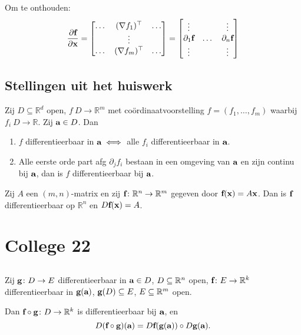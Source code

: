\documentclass{2wa40summary}
\begin{document}
			Om te onthouden:
			\[ \frac{\partial {\textbf{f}}}{\partial {\textbf{x}}} = \begin{bmatrix}
			\dots & (\nabla f_1)^\top & \dots \\
			& \vdots & \\
			\dots & (\nabla f_m)^\top & \dots
			\end{bmatrix} =
			\begin{bmatrix}
			\vdots & & \vdots \\
			\partial_1 {\textbf{f}} & \dots & \partial_n {\textbf{f}} \\
			\vdots & & \vdots
			\end{bmatrix}\]
			
		\subsection{Stellingen uit het huiswerk}
			\theorem Zij $ D \subseteq \mathbb{R}^d $ open, $ f\:  D \to \mathbb{R}^m $ met co\"ordinaatvoorstelling $ f=(f_1,\dots,f_m) $ waarbij $ f_i \:  D \to \mathbb{R} $. Zij $ {\textbf{a}} \in D $. Dan
			\begin{enumerate}[(1)]
				\item $ f $ differentieerbaar in $ {\textbf{a}} \iff $ alle $ f_i $ differentieerbaar in $ {\textbf{a}} $.
				\item Alle eerste orde part afg $ \partial_j f_i $ bestaan in een omgeving van $ {\textbf{a}} $ en zijn continu bij $ {\textbf{a}} $, dan is $ f $ differentieerbaar bij $ {\textbf{a}} $.
			\end{enumerate}
			\theorem Zij $ A $ een $ (m,n) $-matrix en zij $ {\textbf{f}}\colon \mathbb{R}^n \to \mathbb{R}^m $ gegeven door $ {\textbf{f}}({\textbf{x}})=A{\textbf{x}} $. Dan is $ {\textbf{f}} $ differentieerbaar op $ \mathbb{R}^n $ en $ D{\textbf{f}}({\textbf{x}}) = A $.
			
	\newpage
	\section{College 22}
		\subsection{}
			\theorem Zij ${\textbf{g}}\colon D \to E$ differentieerbaar in ${\textbf{a}} \in D$, $D \subseteq \mathbb{R}^n$ open, ${\textbf{f}}\colon E \to \mathbb{R}^k$ differentieerbaar in ${\textbf{g}}({\textbf{a}})$, ${\textbf{g}}(D) \subseteq E$, $E \subseteq \mathbb{R}^m$ open.
			
			Dan ${\textbf{f}}\circ {\textbf{g}}\colon D\to \mathbb{R}^k$ is differentieerbaar bij ${\textbf{a}}$, en \[ D({\textbf{f}} \circ {\textbf{g}})({\textbf{a}}) = D{\textbf{f}}({\textbf{g}}({\textbf{a}}))\circ D{\textbf{g}}({\textbf{a}}). \]
			
\end{document}
